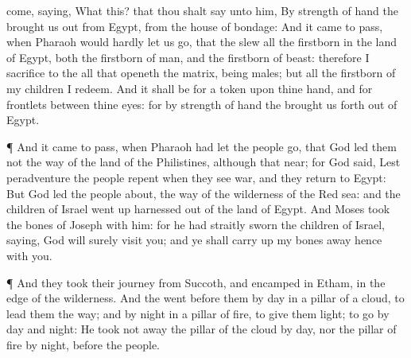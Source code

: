 {come,
saying, What
{} this? that thou shalt
say unto him, By
strength of
hand the
{} brought us
out from
Egypt, from the
house of
bondage:
And it came to pass, when
Pharaoh would
hardly let us
go, that the
{}
slew all the
firstborn in the
land of
Egypt, both the
firstborn of
man, and the
firstborn of
beast: therefore I
sacrifice to the
{} all that
openeth the
matrix, being
males; but all the
firstborn of my
children I
redeem.
And it shall be for a
token upon thine
hand, and for
frontlets between thine
eyes: for by
strength of
hand the
{} brought us
forth out of
Egypt.
\par }{\PP {}¶ And it came to pass, when
Pharaoh had let the
people
go, that
God
led them not
{} the
way of the
land of the
Philistines,
although that
{}
near; for
God
said, Lest peradventure the
people
repent when they
see
war, and they
return to
Egypt:
But
God
led the
people
about,
{} the
way of the
wilderness of the
Red
sea: and the
children of
Israel went
up
harnessed out of the
land of
Egypt.
And
Moses
took the
bones of
Joseph with him: for he had
straitly
sworn the
children of
Israel,
saying,
God will
surely
visit you; and ye shall carry
up my
bones
away hence with you.
\par }{\PP {}¶ And they took their
journey from
Succoth, and
encamped in
Etham, in the
edge of the
wilderness.
And the
{}
went
before them by
day in a
pillar of a
cloud, to
lead them the
way; and by
night in a
pillar of
fire, to give them
light; to
go by
day and
night:
He took not
away the
pillar of the
cloud by
day, nor the
pillar of
fire by
night,
{}
before the
people.

}
